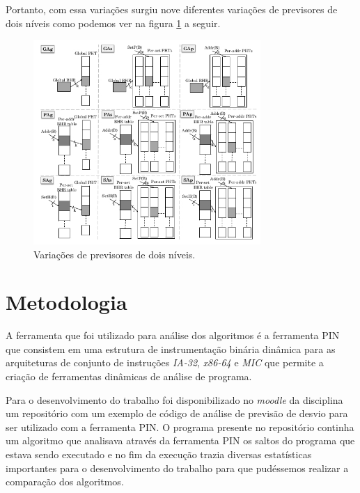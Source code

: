 \documentclass[journal, twoside]{IEEEtran}
\begin{document}
Portanto, com essa variações surgiu nove diferentes variações de previsores de dois níveis como podemos ver na figura \ref{esquema_2_niveis} a seguir.

\begin{figure}[H]
    \centering
    \captionsetup{justification=centering}
    \includegraphics[width=3.4in]{figure/esquemas_dois_niveis.jpeg}
    \caption{Variações de previsores de dois níveis.}
    \label{esquema_2_niveis}
\end{figure}

\section{Metodologia} \label{metodologia}
A ferramenta que foi utilizado para análise dos algoritmos é a ferramenta PIN que consistem em uma estrutura de instrumentação binária dinâmica para as arquiteturas de conjunto de instruções \textit{IA-32}, \textit{x86-64} e \textit{MIC} que permite a criação de ferramentas dinâmicas de análise de programa. \cite{levi}

Para o desenvolvimento do trabalho foi disponibilizado no \textit{moodle} da disciplina um repositório com um exemplo de código de análise de previsão de desvio para ser utilizado com a ferramenta PIN. O programa presente no repositório continha um algoritmo que analisava através da ferramenta PIN os saltos do programa que estava sendo executado e no fim da execução trazia diversas estatísticas importantes para o desenvolvimento do trabalho para que pudéssemos realizar a comparação dos algoritmos.
\end{document}
